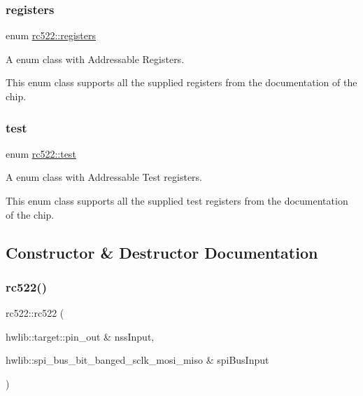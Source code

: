 \subsubsection{\texorpdfstring{registers}{registers}}
{\footnotesize\ttfamily enum \hyperlink{classrc522_a83057db5f8fefa3dc9a6e8e5f0e191ee}{rc522\+::registers}\hspace{0.3cm}{\ttfamily [strong]}}



A enum class with Addressable Registers. 

This enum class supports all the supplied registers from the documentation of the chip. \mbox{\label{classrc522_a9589917c9bbcd18ea9c7d86c7ec565bd}} 
\subsubsection{\texorpdfstring{test}{test}}
{\footnotesize\ttfamily enum \hyperlink{classrc522_a9589917c9bbcd18ea9c7d86c7ec565bd}{rc522\+::test}\hspace{0.3cm}{\ttfamily [strong]}}



A enum class with Addressable Test registers. 

This enum class supports all the supplied test registers from the documentation of the chip. 

\subsection{Constructor \& Destructor Documentation}
\mbox{\label{classrc522_a7f123bdc20d19e897c883ec12f1f0849}} 
\subsubsection{\texorpdfstring{rc522()}{rc522()}}
{\footnotesize\ttfamily rc522\+::rc522 (\begin{DoxyParamCaption}\item[{hwlib\+::target\+::pin\+\_\+out \&}]{nss\+Input,  }\item[{hwlib\+::spi\+\_\+bus\+\_\+bit\+\_\+banged\+\_\+sclk\+\_\+mosi\+\_\+miso \&}]{spi\+Bus\+Input }\end{DoxyParamCaption})}



